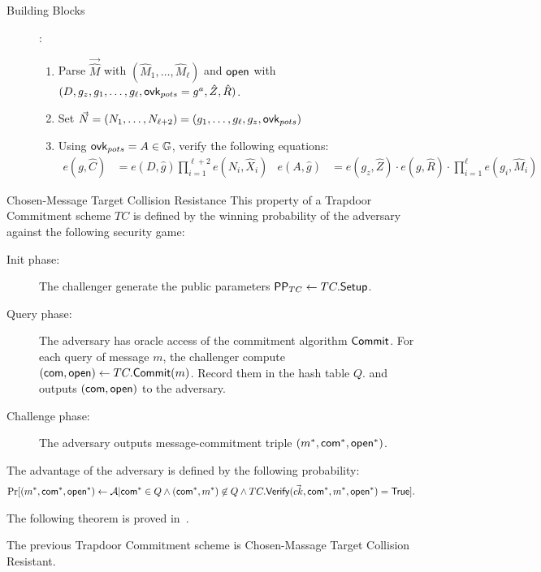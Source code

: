\begin{subsection}{Building Blocks}
\begin{description}
  \item[] :
    \begin{enumerate}
    \item Parse $\vec{\hat{M}}$ with $(\hat{M}_1, \dots, \hat{M}_\ell)$ and $\mathsf{open}$ with $(D, g_z, g_1, \dots, g_\ell, \mathsf{ovk}_{pots} = g^a, \hat{Z}, \hat{R})$.
    \item Set $\vec{N} = (N_1, \dots, N_{\ell+2}) = (g_1, \dots, g_\ell, g_z, \mathsf{ovk}_{pots})$
    \item Using $\mathsf{ovk}_{pots} = A \in \mathbb{G}$, verify the following equations:
      \begin{align*}
	e(g, \hat{C}) &= e(D, \hat{g}) \prod_{i = 1}^{\ell+2} e(N_i, \hat{X}_i) & e(A, \hat{g}) &= e(g_z, \hat{Z}) \cdot e(g, \hat{R}) \cdot \prod_{i = 1}^\ell e(g_i, \hat{M}_i) 
      \end{align*}
    \end{enumerate}
  \end{description}

  \begin{myDef}{Chosen-Message Target Collision Resistance} This property of a Trapdoor Commitment scheme $TC$ is defined by the winning probability of the adversary against the following security game:
    \begin{description}
    \item[Init phase:] The challenger generate the public parameters $\mathsf{PP}_{TC} \gets TC.{\mathsf{Setup}}$.
    \item[Query phase:] The adversary has oracle access of the commitment algorithm ${\mathsf{Commit}}$. For each query of message $m$, the challenger compute $(\mathsf{com}, \mathsf{open}) \gets TC.{\mathsf{Commit}}(m)$. Record them in the hash table $Q$. and outputs $(\mathsf{com}, \mathsf{open})$ to the adversary.
    \item[Challenge phase:] The adversary outputs message-commitment triple $(m^*, \mathsf{com}^*, \mathsf{open}^*)$.
    \end{description}
    The advantage of the adversary is defined by the following probability:
    \begin{align*}
      \operatorname{Pr}[(m^*, \mathsf{com}^*, \mathsf{open}^*) \gets \mathcal{A} | \mathsf{com}^* \in Q \wedge (\mathsf{com}^*, m^*) \not \in Q \wedge TC.{\mathsf{Verify}}(\vec{ck}, \mathsf{com}^*, m^*, \mathsf{open}^*) = \mathsf{True}].
    \end{align*}
  \end{myDef}

  The following theorem is proved in~\cite{DBLP:conf/eurocrypt/AbeKOT15}.

  \begin{myTh}
    The previous Trapdoor Commitment scheme is Chosen-Massage Target Collision Resistant.
  \end{myTh}

  

\end{subsection}


